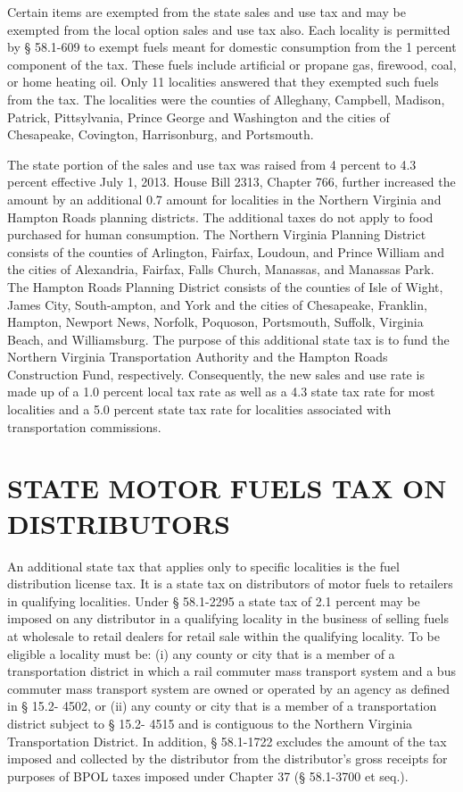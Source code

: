 \documentclass[
]{book}
\begin{document}
Certain items are exempted from the state sales and use tax and may be exempted from the local option sales and use tax also. Each locality is permitted by § 58.1-609 to exempt fuels meant for domestic consumption from the 1 percent component of the tax. These fuels include artificial or propane gas, firewood, coal, or home heating oil. Only 11 localities answered that they exempted such fuels from the tax. The localities were the counties of Alleghany, Campbell, Madison, Patrick, Pittsylvania, Prince George and Washington and the cities of Chesapeake, Covington, Harrisonburg, and Portsmouth.

The state portion of the sales and use tax was raised from 4 percent to 4.3 percent effective July 1, 2013. House Bill 2313, Chapter 766, further increased the amount by an additional 0.7 amount for localities in the Northern Virginia and Hampton Roads planning districts. The additional taxes do not apply to food purchased for human consumption. The Northern Virginia Planning District consists of the counties of Arlington, Fairfax, Loudoun, and Prince William and the cities of Alexandria, Fairfax, Falls Church, Manassas, and Manassas Park. The Hampton Roads Planning District consists of the counties of Isle of Wight, James City, South-ampton, and York and the cities of Chesapeake, Franklin, Hampton, Newport News, Norfolk, Poquoson, Portsmouth, Suffolk, Virginia Beach, and Williamsburg. The purpose of this additional state tax is to fund the Northern Virginia Transportation Authority and the Hampton Roads Construction Fund, respectively. Consequently, the new sales and use rate is made up of a 1.0 percent local tax rate as well as a 4.3 state tax rate for most localities and a 5.0 percent state tax rate for localities associated with transportation commissions.

\hypertarget{state-motor-fuels-tax-on-distributors}{%
\section{STATE MOTOR FUELS TAX ON DISTRIBUTORS}\label{state-motor-fuels-tax-on-distributors}}

An additional state tax that applies only to specific localities is the fuel distribution license tax. It is a state tax on distributors of motor fuels to retailers in qualifying localities. Under § 58.1-2295 a state tax of 2.1 percent may be imposed on any distributor in a qualifying locality in the business of selling fuels at wholesale to retail dealers for retail sale within the qualifying locality. To be eligible a locality must be: (i) any county or city that is a member of a transportation district in which a rail commuter mass transport system and a bus commuter mass transport system are owned or operated by an agency as defined in § 15.2- 4502, or (ii) any county or city that is a member of a transportation district subject to § 15.2- 4515 and is contiguous to the Northern Virginia Transportation District. In addition, § 58.1-1722 excludes the amount of the tax imposed and collected by the distributor from the distributor's gross receipts for purposes of BPOL taxes imposed under Chapter 37 (§ 58.1-3700 et seq.).
\end{document}
